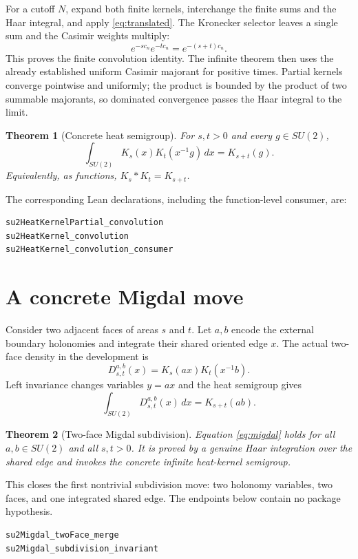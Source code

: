 \documentclass[11pt,a4paper]{article}
\newtheorem{theorem}{Theorem}[section]
\theoremstyle{remark}
\begin{document}
For a cutoff $N$, expand both finite kernels, interchange the finite sums and
the Haar integral, and apply \eqref{eq:translated}.  The Kronecker selector
leaves a single sum and the Casimir weights multiply:
\[
  e^{-s c_n}e^{-t c_n}=e^{-(s+t)c_n}.
\]
This proves the finite convolution identity.  The infinite theorem then uses
the already established uniform Casimir majorant for positive times.  Partial
kernels converge pointwise and uniformly; the product is bounded by the
product of two summable majorants, so dominated convergence passes the Haar
integral to the limit.

\begin{theorem}[Concrete heat semigroup]
For $s,t>0$ and every $g\in SU(2)$,
\[
  \int_{SU(2)}K_s(x)K_t(x^{-1}g)\,dx=K_{s+t}(g).
\]
Equivalently, as functions, $K_s*K_t=K_{s+t}$.
\end{theorem}

The corresponding Lean declarations, including the function-level consumer,
are:
\begin{lstlisting}
su2HeatKernelPartial_convolution
su2HeatKernel_convolution
su2HeatKernel_convolution_consumer
\end{lstlisting}

\section{A concrete Migdal move}

Consider two adjacent faces of areas $s$ and $t$.  Let $a,b$ encode the
external boundary holonomies and integrate their shared oriented edge $x$.
The actual two-face density in the development is
\[
  D_{s,t}^{a,b}(x)=K_s(ax)K_t(x^{-1}b).
\]
Left invariance changes variables $y=ax$ and the heat semigroup gives
\begin{equation}\label{eq:migdal}
  \int_{SU(2)}D_{s,t}^{a,b}(x)\,dx
  =K_{s+t}(ab).
\end{equation}

\begin{theorem}[Two-face Migdal subdivision]
Equation \eqref{eq:migdal} holds for all $a,b\in SU(2)$ and all $s,t>0$.
It is proved by a genuine Haar integration over the shared edge and invokes
the concrete infinite heat-kernel semigroup.
\end{theorem}

This closes the first nontrivial subdivision move: two holonomy variables, two
faces, and one integrated shared edge.  The endpoints below contain no package
hypothesis.
\begin{lstlisting}
su2Migdal_twoFace_merge
su2Migdal_subdivision_invariant
\end{lstlisting}
\end{document}
